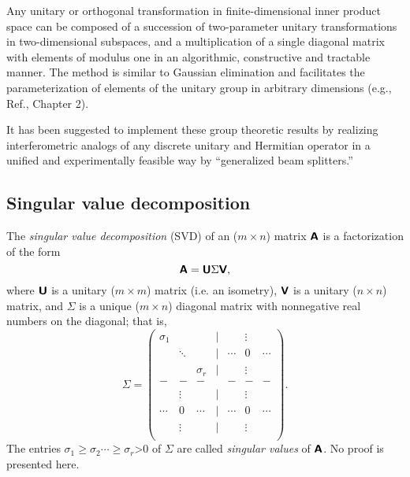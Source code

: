 Any unitary or orthogonal transformation   in finite-dimensional inner product space
can be composed of a succession of two-parameter unitary transformations in
two-dimensional subspaces,
and a multiplication of a single diagonal matrix with elements of modulus one
in an algorithmic, constructive and tractable manner.
The method is similar to Gaussian elimination and facilitates the parameterization of elements
of the unitary group in arbitrary dimensions (e.g., Ref.\cite[-40mm]{murnaghan}, Chapter 2).

{\color{Purple}
It has been suggested to implement
these group theoretic results by realizing interferometric analogs
of any discrete unitary and Hermitian operator
in a unified and experimentally feasible way by ``generalized beam splitters.''\cite[-30mm]{rzbb,reck-94}
}


\subsection{Singular value decomposition}

The {\em singular value decomposition}
(SVD)
of an ($m\times n$)  matrix $\textsf{\textbf{A}}$ is a factorization of the form
\begin{equation}
\textsf{\textbf{A}} = \textsf{\textbf{U}} \Sigma \textsf{\textbf{V}} ,
\end{equation}
where
$\textsf{\textbf{U}}$ is a unitary ($m\times m$)  matrix (i.e. an isometry),
$\textsf{\textbf{V}}$ is a unitary ($n\times n$)  matrix,
and
$\Sigma$ is a unique ($m\times n$)   diagonal matrix with nonnegative real numbers on the diagonal;
that is,
\begin{equation}
\Sigma =
\begin{pmatrix}
\sigma_1&&&{|}&&\vdots& \\
  &\ddots &&{|}&\cdots &0&\cdots \\
&&\sigma_r&{|}&&\vdots& \\
-&-&-&&-&-&- \\
&\vdots&&{|}&&\vdots& \\
\cdots &0&\cdots &{|}&\cdots &0&\cdots \\
&\vdots&&{|}&&\vdots& \\
\end{pmatrix}.
\end{equation}
The entries $\sigma_1\ge \sigma_2 \cdots \ge \sigma_r$>0 of $\Sigma$ are called {\em singular values}
of $\textsf{\textbf{A}}$.  No proof is presented here.

